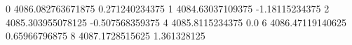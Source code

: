 0 4086.082763671875 0.271240234375
1 4084.63037109375 -1.18115234375
2 4085.303955078125 -0.507568359375
4 4085.8115234375 0.0
6 4086.47119140625 0.65966796875
8 4087.1728515625 1.361328125
